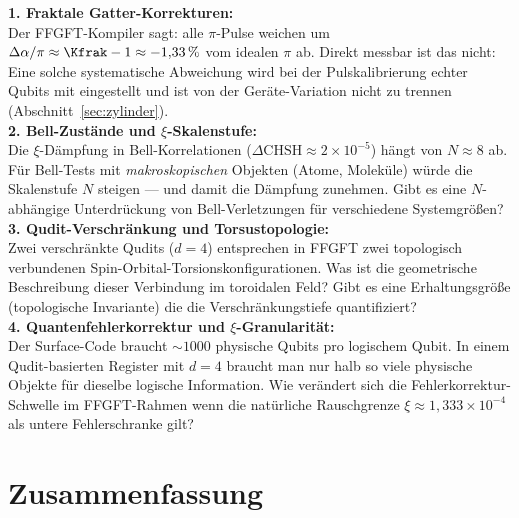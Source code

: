 \begin{significance}
\textbf{1. Fraktale Gatter-Korrekturen:}\\
Der FFGFT-Kompiler sagt: alle $\pi$-Pulse weichen
um $\Delta\alpha/\pi \approx \Kfrak - 1 \approx -1{,}33\,\%$
vom idealen $\pi$ ab.
Direkt messbar ist das nicht: Eine solche systematische
Abweichung wird bei der Pulskalibrierung echter Qubits
mit eingestellt und ist von der Geräte-Variation nicht zu trennen
(Abschnitt~\ref{sec:zylinder}).\\[6pt]

\textbf{2. Bell-Zustände und $\xi$-Skalenstufe:}\\
Die $\xi$-Dämpfung in Bell-Korrelationen
($\Delta\text{CHSH} \approx 2\times10^{-5}$) hängt von $N \approx 8$ ab.
Für Bell-Tests mit \emph{makroskopischen} Objekten
(Atome, Moleküle) würde die Skalenstufe $N$ steigen ---
und damit die Dämpfung zunehmen.
Gibt es eine $N$-abhängige Unterdrückung
von Bell-Verletzungen für verschiedene Systemgrößen?\\[6pt]

\textbf{3. Qudit-Verschränkung und Torsustopologie:}\\
Zwei verschränkte Qudits ($d = 4$) entsprechen
in FFGFT zwei topologisch verbundenen
Spin-Orbital-Torsionskonfigurationen.
Was ist die geometrische Beschreibung
dieser Verbindung im toroidalen Feld?
Gibt es eine Erhaltungsgröße (topologische Invariante)
die die Verschränkungstiefe quantifiziert?\\[6pt]

\textbf{4. Quantenfehlerkorrektur und $\xi$-Granularität:}\\
Der Surface-Code braucht $\sim 1000$ physische Qubits
pro logischem Qubit.
In einem Qudit-basierten Register mit $d = 4$
braucht man nur halb so viele physische Objekte
für dieselbe logische Information.
Wie verändert sich die Fehlerkorrektur-Schwelle
im FFGFT-Rahmen wenn die natürliche Rauschgrenze
$\xi \approx 1{,}333 \times 10^{-4}$ als
untere Fehlerschranke gilt?
\end{significance}

\section{Zusammenfassung}
\label{sec:zusammenfassung-175}

